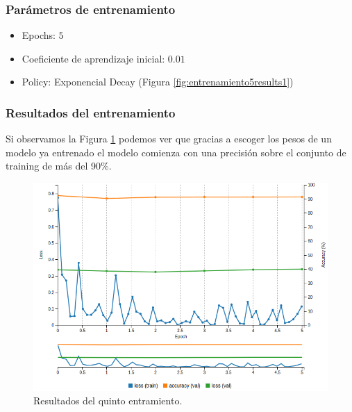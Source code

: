 \documentclass[a4paper,11pt]{book}
\begin{document}
\subsubsection{Parámetros de entrenamiento}
\begin{itemize}
	\item Epochs: \(5\)
	\item Coeficiente de aprendizaje inicial: \(0.01\)
	\item Policy: Exponencial Decay (Figura \ref{fig:entrenamiento5results1})
\end{itemize}
\subsubsection{Resultados del entrenamiento}
Si observamos la Figura \ref{fig:entrenamiento5results} podemos ver que gracias a escoger los pesos de un modelo ya entrenado el modelo comienza con una precisión sobre el conjunto de training de más del 90\%.\\
\begin{figure}[h]
	\centering
	\includegraphics[width=0.9\linewidth]{imagenes/entrenamiento5results}
	\caption[Resultados del entrenamiento 4]{Resultados del quinto entramiento.}
	\label{fig:entrenamiento5results}
\end{figure}
\end{document}
